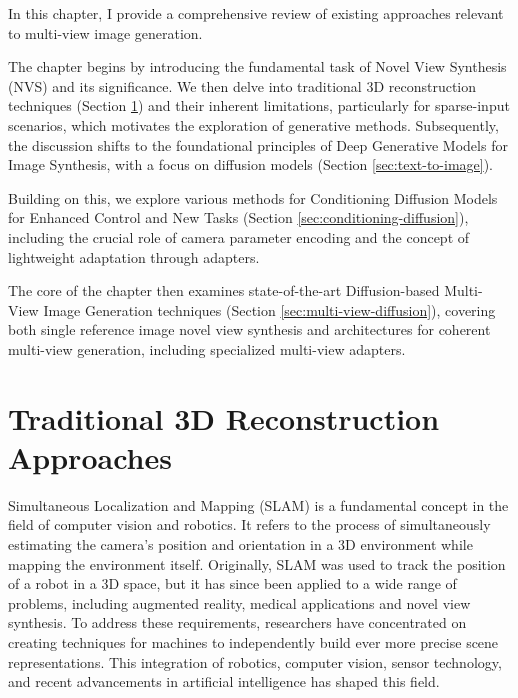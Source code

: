 \label{chapter:related}

In this chapter, I provide a comprehensive review of existing
approaches relevant to multi-view image generation.

The chapter begins by introducing the fundamental task of Novel View
Synthesis (NVS) and its significance. We then delve into traditional
3D reconstruction techniques (Section \ref{sec:3d-reconstruction})
and their inherent limitations, particularly for sparse-input
scenarios, which motivates the exploration of generative methods.
Subsequently, the discussion shifts to the foundational principles of
Deep Generative Models for Image Synthesis, with a focus on diffusion
models (Section \ref{sec:text-to-image}).

Building on this, we explore various methods for Conditioning
Diffusion Models for Enhanced Control and New Tasks (Section
\ref{sec:conditioning-diffusion}), including the crucial role of
camera parameter encoding and the concept of lightweight adaptation
through adapters.

The core of the chapter then examines state-of-the-art
Diffusion-based Multi-View Image Generation techniques (Section
\ref{sec:multi-view-diffusion}), covering both single reference image
novel view synthesis and architectures for coherent multi-view
generation, including specialized multi-view adapters.

\section{Traditional 3D Reconstruction Approaches}\label{sec:3d-reconstruction}

Simultaneous Localization and Mapping (SLAM) is a fundamental concept
in the field of computer vision and robotics. It refers to the
process of simultaneously estimating the camera's position and
orientation in a 3D environment while mapping the environment itself.
Originally, SLAM was used to track the position of a robot in a 3D
space, but it has since been applied to a wide range of problems,
including augmented reality, medical applications and novel view
synthesis. To address these requirements, researchers have
concentrated on creating techniques for machines to independently
build ever more precise scene representations. This integration of
robotics, computer vision, sensor technology, and recent advancements
in artificial intelligence has shaped this field.

